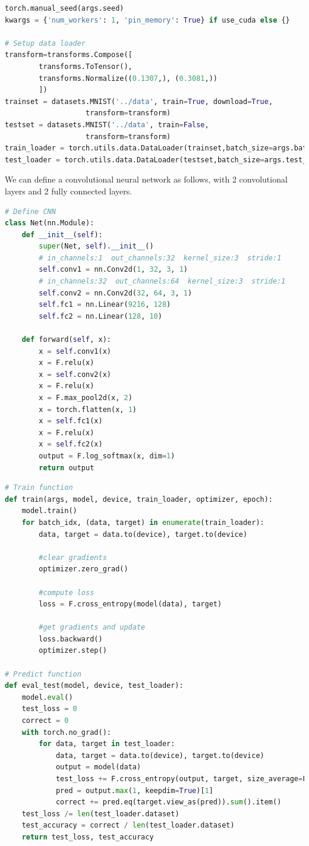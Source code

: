 \begin{lstlisting}[language=Python]
torch.manual_seed(args.seed)
kwargs = {'num_workers': 1, 'pin_memory': True} if use_cuda else {}

# Setup data loader
transform=transforms.Compose([
        transforms.ToTensor(),
        transforms.Normalize((0.1307,), (0.3081,))
        ])
trainset = datasets.MNIST('../data', train=True, download=True,
                   transform=transform)
testset = datasets.MNIST('../data', train=False,
                   transform=transform)
train_loader = torch.utils.data.DataLoader(trainset,batch_size=args.batch_size, shuffle=True,**kwargs)
test_loader = torch.utils.data.DataLoader(testset,batch_size=args.test_batch_size, shuffle=False, **kwargs)
\end{lstlisting}

We can define a convolutional neural network as follows, with 2 convolutional layers and 2 fully connected layers.
\begin{lstlisting}[language=Python]
# Define CNN
class Net(nn.Module):
    def __init__(self):
        super(Net, self).__init__()
        # in_channels:1  out_channels:32  kernel_size:3  stride:1
        self.conv1 = nn.Conv2d(1, 32, 3, 1)
        # in_channels:32  out_channels:64  kernel_size:3  stride:1
        self.conv2 = nn.Conv2d(32, 64, 3, 1)
        self.fc1 = nn.Linear(9216, 128)
        self.fc2 = nn.Linear(128, 10)

    def forward(self, x):
        x = self.conv1(x)
        x = F.relu(x)
        x = self.conv2(x)
        x = F.relu(x)
        x = F.max_pool2d(x, 2)
        x = torch.flatten(x, 1)
        x = self.fc1(x)
        x = F.relu(x)
        x = self.fc2(x)
        output = F.log_softmax(x, dim=1)
        return output
\end{lstlisting}

\begin{lstlisting}[language=Python]
# Train function
def train(args, model, device, train_loader, optimizer, epoch):
    model.train()
    for batch_idx, (data, target) in enumerate(train_loader):
        data, target = data.to(device), target.to(device)
        
        #clear gradients
        optimizer.zero_grad()
        
        #compute loss
        loss = F.cross_entropy(model(data), target)
        
        #get gradients and update
        loss.backward()
        optimizer.step()
        
# Predict function
def eval_test(model, device, test_loader):
    model.eval()
    test_loss = 0
    correct = 0
    with torch.no_grad():
        for data, target in test_loader:
            data, target = data.to(device), target.to(device)
            output = model(data)
            test_loss += F.cross_entropy(output, target, size_average=False).item()
            pred = output.max(1, keepdim=True)[1]
            correct += pred.eq(target.view_as(pred)).sum().item()
    test_loss /= len(test_loader.dataset)
    test_accuracy = correct / len(test_loader.dataset)
    return test_loss, test_accuracy
\end{lstlisting}

